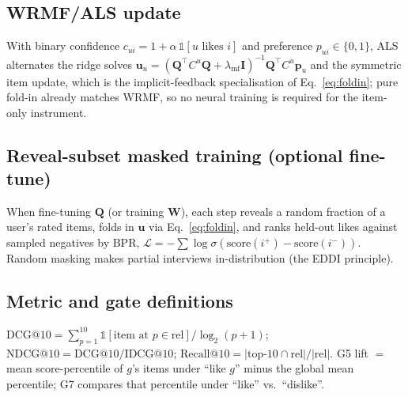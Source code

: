 \documentclass[11pt]{article}
\newcommand{\Q}{\mathbf{Q}}
\newcommand{\uu}{\mathbf{u}}
\newcommand{\W}{\mathbf{W}}
\newcommand{\I}{\mathbf{I}}
\begin{document}
\subsection{WRMF/ALS update}
With binary confidence $c_{ui}=1+\alpha\,\mathbb 1[u\text{ likes }i]$ and preference $p_{ui}\in\{0,1\}$, ALS
alternates the ridge solves
$\uu_u=(\Q^\top C^u\Q+\lambda_{\mathrm{mf}}\I)^{-1}\Q^\top C^u\mathbf p_u$ and the symmetric item update, which is
the implicit-feedback specialisation of Eq.~\eqref{eq:foldin}; pure fold-in already matches WRMF, so no neural
training is required for the item-only instrument.

\subsection{Reveal-subset masked training (optional fine-tune)}
When fine-tuning $\Q$ (or training $\W$), each step reveals a random fraction of a user's rated items, folds in
$\uu$ via Eq.~\eqref{eq:foldin}, and ranks held-out likes against sampled negatives by BPR,
$\mathcal L=-\sum\log\sigma(\mathrm{score}(i^+)-\mathrm{score}(i^-))$. Random masking makes partial interviews
in-distribution (the EDDI principle).

\subsection{Metric and gate definitions}
$\mathrm{DCG@10}=\sum_{p=1}^{10}\mathbb 1[\text{item at }p\in\mathrm{rel}]/\log_2(p+1)$;
$\mathrm{NDCG@10}=\mathrm{DCG@10}/\mathrm{IDCG@10}$; $\mathrm{Recall@10}=|\text{top-}10\cap\mathrm{rel}|/|\mathrm{rel}|$.
G5 lift $=$ mean score-percentile of $g$'s items under ``like $g$'' minus the global mean percentile; G7 compares
that percentile under ``like'' vs.\ ``dislike''.
\end{document}
